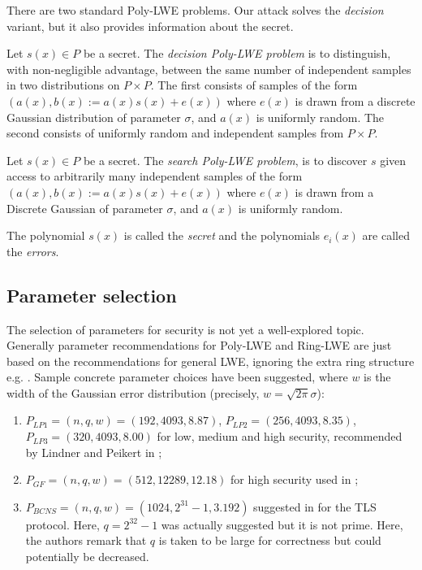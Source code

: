 \documentclass{llncs}
\newcommand{\<}{\langle}
\renewcommand{\>}{\rangle}
\begin{document}
There are two standard Poly-LWE problems.  Our attack solves the \emph{decision} variant, but it also provides information about the secret.



\begin{problem} \label{PLWED}
Let $s(x) \in P$ be a secret.  The \emph{decision Poly-LWE problem} is to distinguish, with non-negligible advantage, between the same number of independent samples in two distributions on $P\times P$.  The first consists of samples of the form $(a(x), b(x) := a(x) s(x) + e(x) )$ where $e(x)$ is drawn from a discrete Gaussian distribution of parameter $\sigma$, and $a(x)$ is uniformly random.  The second consists of uniformly random and independent samples from $P \times P$.

\end{problem}

\begin{problem} \label{PLWES}
         Let $s(x) \in P$ be a secret. The \emph{search Poly-LWE problem}, is to discover $s$ given access to arbitrarily many independent samples of the form $(a(x), b(x) := a(x)s(x) + e(x))$ where $e(x)$ is drawn from a Discrete Gaussian of parameter $\sigma$, and $a(x)$ is uniformly random.
\end{problem}

\noindent
The polynomial $s(x)$ is called the \emph{secret} and the polynomials $e_i(x)$ are called the \emph{errors}.



\subsection{Parameter selection}
\label{sec:parameters}

The selection of parameters for security is not yet a well-explored topic.  Generally parameter recommendations for Poly-LWE and Ring-LWE are just based on the recommendations for general LWE, ignoring the extra ring structure e.g. \cite{PG,RV,BCNS}.  Sample concrete parameter choices  have been suggested, where $w$ is the width of the Gaussian error distribution  (precisely, $w = \sqrt{2\pi} \sigma$):

\begin{enumerate}
        \item $P_{LP1} = (n,q,w) = (192, 4093, 8.87)$, $P_{LP2} = (256, 4093, 8.35)$, $P_{LP3} = (320, 4093, 8.00)$ for low, medium and high security, recommended by Lindner and Peikert in \cite{LP};
        \item $P_{GF} = (n,q,w) = (512, 12289,12.18)$ for high security used in \cite{GF};
        \item $P_{BCNS} = (n,q,w) = (1024, 2^{31}-1, 3.192)$ suggested in \cite{BCNS} for the TLS protocol.  Here, $q = 2^{32}-1$ was actually suggested but it is not prime.  Here, the authors remark that $q$ is taken to be large for correctness but could potentially be decreased.
\end{enumerate}
\end{document}
